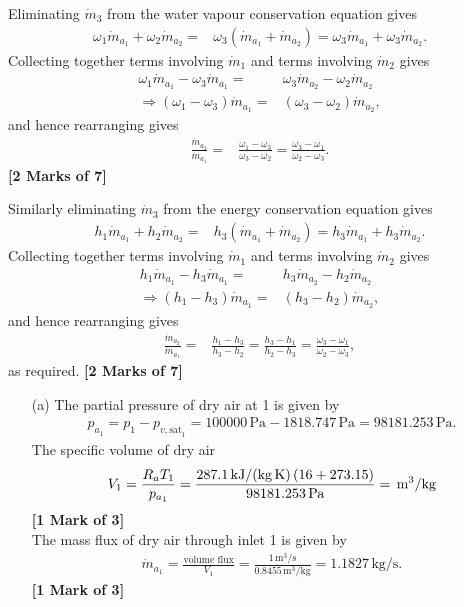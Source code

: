 \documentclass[12pt,twoside]{report}
\begin{document}
\begin{description}
Eliminating $\dot{m}_3$ from the water vapour conservation equation gives
\begin{align*}
 \omega_1 \dot{m}_{a_1} + \omega_2 \dot{m}_{a_2} =& \omega_3\left(\dot{m}_{a_1} + \dot{m}_{a_2}\right) = \omega_3 \dot{m}_{a_1} + \omega_3 \dot{m}_{a_2}.
\end{align*}
Collecting together terms involving $\dot{m}_1$ and terms involving $\dot{m}_2$ gives
\begin{align*}
 \omega_1 \dot{m}_{a_1} - \omega_3 \dot{m}_{a_1} =& \omega_3 \dot{m}_{a_2} - \omega_2 \dot{m}_{a_2} \nonumber \\
 \Rightarrow \left(\omega_1 - \omega_3\right) \dot{m}_{a_1} =& \left(\omega_3 - \omega_2\right) \dot{m}_{a_2},
\end{align*}
and hence rearranging gives
\begin{align*}
 \frac{\dot{m}_{a_2}}{\dot{m}_{a_1}} =& \frac{\omega_1 - \omega_3}{\omega_3 - \omega_2} = \frac{\omega_3 - \omega_1}{\omega_2 - \omega_3}.
\end{align*}\hfill \textbf{[2 Marks of 7]}

Similarly eliminating $\dot{m}_3$ from the energy conservation equation gives
\begin{align*}
 h_1 \dot{m}_{a_1} + h_2 \dot{m}_{a_2} =& h_3\left(\dot{m}_{a_1} + \dot{m}_{a_2}\right) = h_3 \dot{m}_{a_1} + h_3 \dot{m}_{a_2}.
\end{align*}
Collecting together terms involving $\dot{m}_1$ and terms involving $\dot{m}_2$ gives
\begin{align*}
 h_1 \dot{m}_{a_1} - h_3 \dot{m}_{a_1} =& h_3 \dot{m}_{a_2} - h_2 \dot{m}_{a_2} \nonumber \\
 \Rightarrow \left(h_1 - h_3\right) \dot{m}_{a_1} =& \left(h_3 - h_2\right) \dot{m}_{a_2},
\end{align*}
and hence rearranging gives
\begin{align*}
 \frac{\dot{m}_{a_2}}{\dot{m}_{a_1}} =& \frac{h_1 - h_3}{h_3 - h_2} = \frac{h_3 - h_1}{h_2 - h_3} = \frac{\omega_3 - \omega_1}{\omega_2 - \omega_3},
\end{align*}
as required. \hfill \textbf{[2 Marks of 7]}

\begin{itemize}
\item[(a)] The partial pressure of dry air at 1 is given by
\begin{align*}
 p_{a_1} = p_1 - p_{{v,\text{sat}}_1} = 100000\,\mbox{Pa} - 1818.747\,\mbox{Pa} = 98181.253\,\mbox{Pa}.
\end{align*}
The specific volume of dry air
\begin{align*}
 V_1 = \frac{R_a T_1}{p_{a_1}} = \frac{287.1\,\mbox{kJ/(kg\,K)} \left(16 + 273.15\right)}{98181.253\,\mbox{Pa}} = \,\mbox{m}^3\mbox{/kg}
\end{align*} \hfill \textbf{[1 Mark of 3]} \\
The mass flux of dry air through inlet 1 is given by
\begin{align*}
 \dot{m}_{a_1} = \frac{\mbox{volume flux}}{V_1} = \frac{1\,\mbox{m}^3\mbox{/s}}{0.8455\,\mbox{m}^3\mbox{/kg}} = 1.1827\,\mbox{kg/s}.
\end{align*} \hfill \textbf{[1 Mark of 3]}


\end{itemize}
\end{description}
\end{document}

